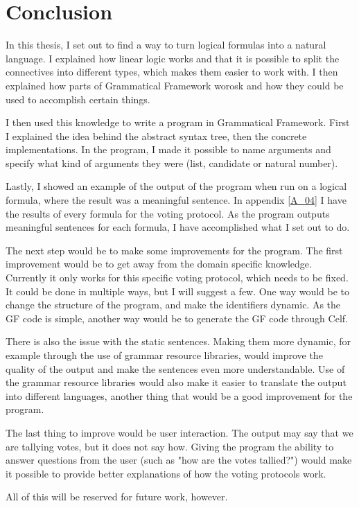 \chapter{Conclusion}
\label{05}

In this thesis, I set out to find a way to turn logical formulas into a natural language. I explained how linear logic works and that it is possible to split the connectives into different types, which makes them easier to work with. I then explained how parts of Grammatical Framework worosk and how they could be used to accomplish certain things. 

I then used this knowledge to write a program in Grammatical Framework. First I explained the idea behind the abstract syntax tree, then the concrete implementations. In the program, I made it possible to name arguments and specify what kind of arguments they were (list, candidate or natural number). 

Lastly, I showed an example of the output of the program when run on a logical formula, where the result was a meaningful sentence. In appendix \ref{A_04} I have the results of every formula for the voting protocol. As the program outputs meaningful sentences for each formula, I have accomplished what I set out to do.

The next step would be to make some improvements for the program. The first improvement would be to get away from the domain specific knowledge. Currently it only works for this specific voting protocol, which needs to be fixed. It could be done in multiple ways, but I will suggest a few. One way would be to change the structure of the program, and make the identifiers dynamic. As the GF code is simple, another way would be to generate the GF code through Celf.

There is also the issue with the static sentences. Making them more dynamic, for example through the use of grammar resource libraries, would improve the quality of the output and make the sentences even more understandable. Use of the grammar resource libraries would also make it easier to translate the output into different languages, another thing that would be a good improvement for the program.

The last thing to improve would be user interaction. The output may say that we are tallying votes, but it does not say how. Giving the program the ability to answer questions from the user (such as "how are the votes tallied?") would make it possible to provide better explanations of how the voting protocols work.

All of this will be reserved for future work, however.
